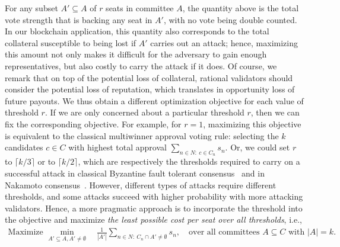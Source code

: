 For any subset $A'\subseteq A$ of $r$ seats in committee $A$, the quantity above is the total vote strength that is backing any seat in $A'$, with no vote being double counted. In our blockchain application, this quantity also corresponds to the total collateral susceptible to being lost if $A'$ carries out an attack; hence, maximizing this amount not only makes it difficult for the adversary to gain enough representatives, but also costly to carry the attack if it does. Of course, we remark that on top of the potential loss of collateral, rational validators should consider the potential loss of reputation, which translates in opportunity loss of future payouts. %
%
We thus obtain a different optimization objective for each value of threshold $r$. 
If we are only concerned about a particular threshold $r$, then we can fix the corresponding objective. 
For example, for $r=1$, maximizing this objective is equivalent to the classical multiwinner approval voting rule: selecting the $k$ candidates $c\in C$ with highest total approval $\sum_{n\in N: \ c\in C_n} s_n$. 
Or, we could set $r$ to $\lceil k/3\rceil$ or to $\lceil k/2\rceil$, which are respectively the thresholds required to carry on a successful attack in classical Byzantine fault tolerant consensus~\cite{pease1980reaching} and in Nakamoto consensus~\cite{stifter2018agreement}. 
However, different types of attacks require different thresholds, and some attacks succeed with higher probability with more attacking validators. Hence, a more pragmatic approach is to incorporate the threshold into the objective and maximize \emph{the least possible cost per seat over all thresholds}, i.e.,  
\begin{align}\label{eq:security}
    \text{Maximize } \min_{A'\subseteq A, A'\neq \emptyset} \quad \frac{1}{|A'|} \sum_{n\in N: \ C_n\cap A' \neq \emptyset} s_n, \quad \text{over all committees $A\subseteq C$ with $|A|=k$}.
\end{align}

